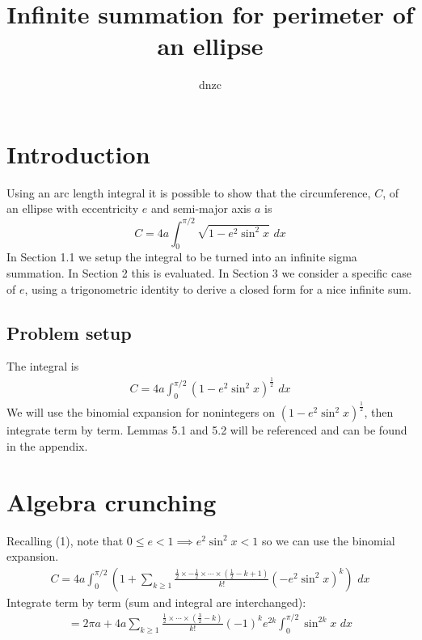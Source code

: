 \documentclass{article}
\begin{document}
\title{Infinite summation for perimeter of an ellipse}
\author{dnzc}
\date{}

\maketitle

\tableofcontents
\newpage



\section{Introduction}
Using an arc length integral it is possible to show that the circumference, $C$, of an ellipse with eccentricity $e$ and semi-major axis $a$ is
\[C = 4a\int_{0}^{\pi/2}\sqrt{1 - e^2\sin^2x}\,\,dx\]
In Section 1.1 we setup the integral to be turned into an infinite sigma summation. 
In Section 2 this is evaluated. In Section 3 we consider a specific case of $e$, using a trigonometric identity to derive a closed form for a nice infinite sum.

\subsection{Problem setup}
The integral is
\begin{equation}
\begin{split}
	C = 4a\int_{0}^{\pi/2}(1 - e^2\sin^2x)^\frac{1}{2}\,\,dx
\end{split}
\end{equation}
We will use the binomial expansion for nonintegers on $(1 - e^2\sin^2x)^\frac{1}{2}$, then integrate term by term.
Lemmas 5.1 and 5.2 will be referenced and can be found in the appendix.



\section{Algebra crunching}
Recalling (1), note that $0 \leq e < 1 \implies e^2\sin^2x < 1$ so we can use the binomial expansion.
\begin{equation*}
\begin{split}
	C = 4a\int_{0}^{\pi/2}\left(1 + \sum_{k\geq 1}\frac{\frac{1}{2}\times-\frac{1}{2}\times\cdots\times(\frac{1}{2}-k+1)}{k!}(-e^2\sin^2x)^k\right)\,\,dx
\end{split}
\end{equation*}
Integrate term by term (sum and integral are interchanged):
\begin{equation*}
\begin{split}
	= 2\pi a + 4a\sum_{k\geq 1}\frac{\frac{1}{2}\times\cdots\times(\frac{3}{2}-k)}{k!}(-1)^ke^{2k}\int_{0}^{\pi/2}\sin^{2k}x\,\,dx\\
\end{split}
\end{equation*}
\end{document}
